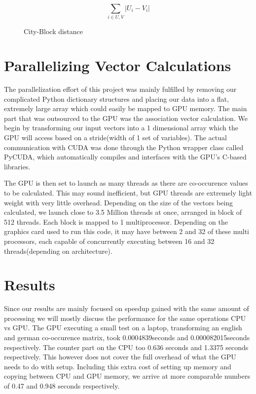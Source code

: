 \documentclass[12pt]{article}
\begin{document}
\begin{figure}
$$\sum_{i\in U,V} |U_i - V_i| $$
\caption{City-Block distance}
  \label{cityblock}
\end{figure}

\section{Parallelizing Vector Calculations}

The parallelization effort of this project was mainly fulfilled by removing our complicated Python dictionary structures and placing our data into a flat, extremely large array which could easily be mapped to GPU memory. The main part that was outsourced to the GPU was the association vector calculation. We begin by transforming our input vectors into a 1 dimensional array which the GPU will access based on a stride(width of 1 set of variables). The actual communication with CUDA was done through the Python wrapper class called PyCUDA, which automatically compiles and interfaces with the GPU's C-based libraries.

The GPU is then set to launch as many threads as there are co-occurence values to be calculated. This may sound inefficient, but GPU threads are extremely light weight with very little overhead. Depending on the size of the vectors being calculated, we launch close to 3.5 Million threads at once, arranged in block of 512 threads. Each block is mapped to 1 multiprocessor. Depending on the graphics card used to run this code, it may have between 2 and 32 of these multi processors, each capable of concurrently executing between 16 and 32 threads(depending on architecture).

\section{Results}

Since our results are mainly focused on speedup gained with the same amount of processing we will mostly discuss the performance for the same operations CPU vs GPU. The GPU executing a small test on a laptop, transforming an english and german co-occurence matrix, took 0.0004839seconds and 0.000082015seconds respectively. The counter part on the CPU too 0.636 seconds and 1.3375 seconds respectively. This however does not cover the full overhead of what the GPU needs to do with setup. Including this extra cost of setting up memory and copying between CPU and GPU memory, we arrive at more comparable numbers of 0.47 and 0.948 seconds respectively.
\end{document}
